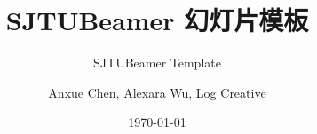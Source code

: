 \documentclass[
    aspectratio=169,                   %
]{ctexbeamer}
\begin{document}
\title{SJTUBeamer 幻灯片模板}  %
\subtitle{SJTUBeamer Template}         %
\author{Anxue Chen, Alexara Wu, Log Creative}                  %
\date{\today}                          %
\maketitle                             %
\makebottom     %
\end{document}
